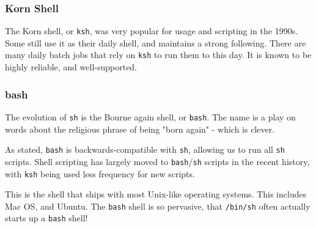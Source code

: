 \subsubsection{Korn Shell}
The Korn shell, or {\tt ksh}, was very popular for usage and scripting in the 1990s.
Some still use it as their daily shell, and maintains a strong following. There
are many daily batch jobs that rely on {\tt ksh} to run them to this day. It is known
to be highly reliable, and well-supported.

\subsubsection{bash}

The evolution of {\tt sh} is the Bourne again shell, or {\tt bash}. The name
is a play on words about the religious phrase of being "born again" - which
is clever.

As stated, {\tt bash} is backwards-compatible with {\tt sh}, allowing us to run
all {\tt sh} scripts. Shell scripting has largely moved to {\tt bash}/{\tt sh} scripts in the
recent history, with {\tt ksh} being used less frequency for new scripts.

This is the shell that ships with most Unix-like operating systems. This includes Mac OS,
and Ubuntu.
The {\tt bash} shell is so pervasive, that {\tt /bin/sh} often actually
starts up a {\tt bash} shell!




